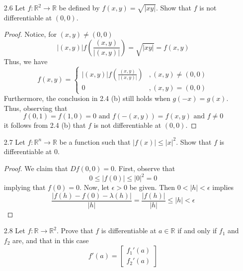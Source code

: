 \begin{enumerate}
    \item[2.6] Let \( f: \mathbb{R}^2 \rightarrow \mathbb{R} \) be defined by \( f(x,y) = \sqrt{\left|xy\right|} \). Show that \( f \) is not differentiable at \( (0,0) \). 
    
    \begin{proof}
    Notice, for \( (x,y) \neq (0,0) \)
    \[
    \left| (x,y) \right| f\left( \frac{(x,y)}{\left|(x,y)\right|} \right) = \sqrt{\left|xy\right|} = f(x,y)
    \]
    Thus, we have 
    \[
    f(x,y) = \begin{cases} \left| (x,y) \right| f\left( \frac{(x,y)}{\left|(x,y)\right|} \right) &, (x,y) \neq (0,0) \\ 0 &, (x,y) = (0,0) \end{cases}
    \]
    Furthermore, the conclusion in 2.4 (b) still holds when \( g(-x) = g(x) \). Thus, observing that
    \[
    f(0,1) = f(1,0) = 0 \text{ and } f(-(x,y)) = f(x,y) \text{ and } f \neq 0
    \]
    it follows from 2.4 (b) that \( f \) is not differentiable at \( (0,0) \). 
    \end{proof}
    
    \item[2.7] Let \( f: \mathbb{R}^n \rightarrow \mathbb{R} \) be a function such that \( \left| f(x) \right| \leq \left| x \right|^2 \). Show that \( f \) is differentiable at \( 0 \). 
    
    \begin{proof}
    We claim that \( Df(0,0) = 0 \). First, observe that
    \[
    0 \leq \left| f(0) \right| \leq \left| 0 \right|^2 = 0
    \]
    implying that \( f(0) = 0 \). Now, let \( \epsilon > 0 \) be given. Then \( 0 < \left| h \right| < \epsilon \) implies 
    \[
    \frac{\left| f(h) - f(0) - \lambda(h) \right|}{\left| h \right|} = \frac{\left| f(h) \right|}{\left| h \right|} \leq \left| h \right| < \epsilon
    \]
    \end{proof}
    
    \item[2.8] Let \( f: \mathbb{R} \rightarrow \mathbb{R}^2 \). Prove that \( f \) is differentiable at \( a \in \mathbb{R} \) if and only if \( f_1 \) and \( f_2 \) are, and that in this case
    \[
    f'(a) = \begin{bmatrix} f_1'(a) \\ f_2'(a) \end{bmatrix}
    \]
    

\end{enumerate}
